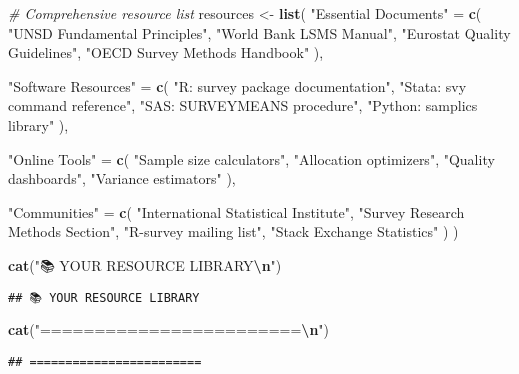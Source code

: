 \documentclass[
]{article}
\newenvironment{Shaded}{\begin{snugshade}}{\end{snugshade}}
\newcommand{\CommentTok}[1]{\textcolor[rgb]{0.56,0.35,0.01}{\textit{#1}}}
\newcommand{\FunctionTok}[1]{\textcolor[rgb]{0.13,0.29,0.53}{\textbf{#1}}}
\newcommand{\NormalTok}[1]{#1}
\newcommand{\OtherTok}[1]{\textcolor[rgb]{0.56,0.35,0.01}{#1}}
\newcommand{\SpecialCharTok}[1]{\textcolor[rgb]{0.81,0.36,0.00}{\textbf{#1}}}
\newcommand{\StringTok}[1]{\textcolor[rgb]{0.31,0.60,0.02}{#1}}
\begin{document}
\begin{Shaded}
\begin{Highlighting}[]
\CommentTok{\# Comprehensive resource list}
\NormalTok{resources }\OtherTok{\textless{}{-}} \FunctionTok{list}\NormalTok{(}
  \StringTok{"Essential Documents"} \OtherTok{=} \FunctionTok{c}\NormalTok{(}
    \StringTok{"UNSD Fundamental Principles"}\NormalTok{,}
    \StringTok{"World Bank LSMS Manual"}\NormalTok{,}
    \StringTok{"Eurostat Quality Guidelines"}\NormalTok{,}
    \StringTok{"OECD Survey Methods Handbook"}
\NormalTok{  ),}
  
  \StringTok{"Software Resources"} \OtherTok{=} \FunctionTok{c}\NormalTok{(}
    \StringTok{"R: survey package documentation"}\NormalTok{,}
    \StringTok{"Stata: svy command reference"}\NormalTok{,}
    \StringTok{"SAS: SURVEYMEANS procedure"}\NormalTok{,}
    \StringTok{"Python: samplics library"}
\NormalTok{  ),}
  
  \StringTok{"Online Tools"} \OtherTok{=} \FunctionTok{c}\NormalTok{(}
    \StringTok{"Sample size calculators"}\NormalTok{,}
    \StringTok{"Allocation optimizers"}\NormalTok{,}
    \StringTok{"Quality dashboards"}\NormalTok{,}
    \StringTok{"Variance estimators"}
\NormalTok{  ),}
  
  \StringTok{"Communities"} \OtherTok{=} \FunctionTok{c}\NormalTok{(}
    \StringTok{"International Statistical Institute"}\NormalTok{,}
    \StringTok{"Survey Research Methods Section"}\NormalTok{,}
    \StringTok{"R{-}survey mailing list"}\NormalTok{,}
    \StringTok{"Stack Exchange Statistics"}
\NormalTok{  )}
\NormalTok{)}

\FunctionTok{cat}\NormalTok{(}\StringTok{"📚 YOUR RESOURCE LIBRARY}\SpecialCharTok{\textbackslash{}n}\StringTok{"}\NormalTok{)}
\end{Highlighting}
\end{Shaded}

\begin{verbatim}
## 📚 YOUR RESOURCE LIBRARY
\end{verbatim}

\begin{Shaded}
\begin{Highlighting}[]
\FunctionTok{cat}\NormalTok{(}\StringTok{"========================}\SpecialCharTok{\textbackslash{}n}\StringTok{"}\NormalTok{)}
\end{Highlighting}
\end{Shaded}

\begin{verbatim}
## ========================
\end{verbatim}
\end{document}
